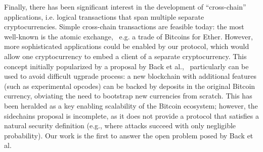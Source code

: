   Finally, there has been significant interest in the development of ``cross-chain'' applications, i.e. logical transactions that span multiple separate cryptocurrencies.
  Simple cross-chain transactions are feasible today: the most well-known is the atomic exchange,~\cite{tiernolan} e.g. a trade of Bitcoins for Ether.
  However, more sophisticated applications could be enabled by our protocol, which would allow one cryptocurrency to embed a client of a separate cryptocurrency.
  This concept initially popularized by a proposal by Back et al.,~\cite{sidechains} particularly can be used to avoid difficult ugprade process: a new blockchain with additional features (such as experimental opcodes) can be backed by deposits in the original Bitcoin currency, obviating the need to bootstrap new currencies from scratch.
  This has been heralded as a key enabling scalability of the Bitcoin ecosystem;
  however, the sidechains proposal is incomplete, as it does not provide a protocol that satisfies a natural security definition (e.g., where attacks succeed with only negligible probability). Our work is the first to answer the open problem posed by Back et al.

\noindent 
